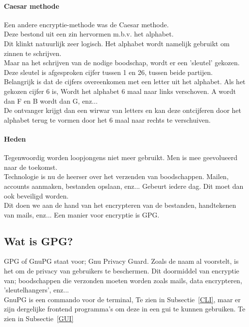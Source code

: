 \documentclass[12pt]{article}
\begin{document}
			\paragraph{Caesar methode}
				Een andere encryptie-methode was de Caesar methode.\\
				Deze bestond uit een zin hervormen m.b.v. het alphabet.\\ 
				Dit klinkt natuurlijk zeer logisch.
				Het alphabet wordt namelijk gebruikt om zinnen te schrijven.\\
				Maar na het schrijven van de nodige boodschap, wordt er een 'sleutel' gekozen. Deze 					sleutel is afgesproken cijfer tussen 1 en 26, tussen beide partijen.\\
				Belangrijk is dat de cijfers overeenkomen met een letter uit het alphabet. Als het 						gekozen cijfer 6 is, Wordt het alphabet 6 maal naar links verschoven. A wordt dan F 					en B wordt dan G, enz...\\
				De ontvanger krijgt dan een wirwar van letters en kan deze ontcijferen door het 						alphabet terug te vormen door het 6 maal naar rechts te verschuiven.\\

			\newpage
			\paragraph{Heden}
				Tegenwoordig worden loopjongens niet meer gebruikt. Men is mee geevolueerd naar de 						toekomst.\\
				Technologie is nu de heerser over het verzenden van boodschappen.
				Mailen, accounts aanmaken, bestanden opslaan, enz... Gebeurt iedere dag. Dit moet dan 					ook beveiligd worden.\\
				Dit doen we aan de hand van het encrypteren van de bestanden, 						handtekenen van mails,
				enz...
				Een manier voor encryptie is GPG.

			\newpage
			\subsection{Wat is GPG?}
				GPG of GnuPG staat voor; Gnu Privacy Guard. Zoals de naam al voorstelt, is het om de 					privacy van gebruikers te beschermen. Dit doormiddel van encryptie van; boodschappen 					die verzonden moeten worden zoals mails, data encrypteren, 'sleutelhangers', enz... 					\\
				GnuPG is een commando voor de terminal, Te zien in Subsectie~\ref{CLI}, maar er zijn 					dergelijke frontend programma's om deze in een gui te kunnen gebruiken. 				Te zien in Subsectie~\ref{GUI}
\end{document}
